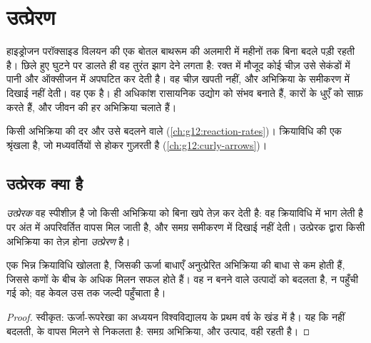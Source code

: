 \chapter{उत्प्रेरण}\label{ch:g12:catalysis}

हाइड्रोजन परॉक्साइड विलयन की एक बोतल बाथरूम की अलमारी में महीनों तक
बिना बदले पड़ी रहती है। छिले हुए घुटने पर डालते ही वह तुरंत झाग देने लगता है:
रक्त में मौजूद कोई चीज़ उसे सेकंडों में पानी और ऑक्सीजन में
अपघटित कर देती है। वह चीज़ खपती नहीं, और अभिक्रिया के समीकरण में
दिखाई नहीं देती। वह एक  है।  ही अधिकांश
रासायनिक उद्योग को संभव बनाते हैं, कारों के धुएँ को साफ़ करते हैं, और जीवन की हर
अभिक्रिया चलाते हैं।

\begin{recall}
किसी अभिक्रिया की दर और उसे बदलने वाले 
(\cref{ch:g12:reaction-rates})। क्रियाविधि  की एक श्रृंखला है,
जो मध्यवर्तियों से होकर गुज़रती है (\cref{ch:g12:curly-arrows})।
\end{recall}

\section{उत्प्रेरक क्या है}

\begin{definition}[उत्प्रेरक, उत्प्रेरण]\label{def:g12:catalysis:catalyst}
\emph{उत्प्रेरक} वह स्पीशीज़ है जो किसी अभिक्रिया को
बिना खपे तेज़ कर देती है: वह क्रियाविधि में भाग लेती है पर अंत में
अपरिवर्तित वापस मिल जाती है, और समग्र समीकरण में दिखाई नहीं
देती। उत्प्रेरक द्वारा किसी अभिक्रिया का तेज़ होना
\emph{उत्प्रेरण} है।
\end{definition}

\begin{proposition}[उत्प्रेरक रास्ता बदलता है, मंज़िल नहीं]\label{prop:g12:catalysis:path}
 एक भिन्न क्रियाविधि खोलता है, जिसकी ऊर्जा बाधाएँ
अनुत्प्रेरित अभिक्रिया की बाधा से कम होती हैं, जिससे कणों के बीच के अधिक
मिलन सफल होते हैं। वह न बनने वाले उत्पादों को बदलता है, न
पहुँची गई  को; वह केवल उस तक जल्दी पहुँचाता है।
\end{proposition}

\begin{proof}
स्वीकृत: ऊर्जा-रूपरेखा का अध्ययन विश्वविद्यालय के प्रथम वर्ष के खंड में है। यह कि  नहीं बदलती,  के वापस मिलने से निकलता है:
समग्र अभिक्रिया,  और उत्पाद, वही रहती है।
\end{proof}

